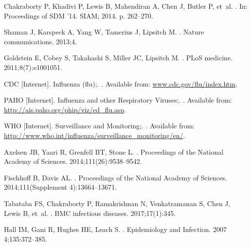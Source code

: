 \documentclass[10pt,letterpaper]{article}
\begin{document}
\begin{thebibliography}{10}

Chakraborty P, Khadivi P, Lewis B, Mahendiran A, Chen J, Butler P, et~al.
.
\newblock In: Proceedings of SDM '14. SIAM; 2014. p. 262--270.

Shaman J, Karspeck A, Yang W, Tamerius J, Lipsitch M.
.
\newblock Nature communications. 2013;4.

Goldstein E, Cobey S, Takahashi S, Miller JC, Lipsitch M.
.
\newblock PLoS medicine. 2011;8(7):e1001051.

{CDC [Internet]}. {Influenza (flu)};.
.
\newblock Available from: \url{www.cdc.gov/flu/index.htm}.

{PAHO [Internet]}. {Influenza and other Respiratory Viruses};.
.
\newblock Available from: \url{http://ais.paho.org/phip/viz/ed_flu.asp}.

{WHO [Internet]}. {Surveillance and Monitoring};.
.
\newblock Available from:
  \url{http://www.who.int/influenza/surveillance_monitoring/en/}.

Axelsen JB, Yaari R, Grenfell BT, Stone L.
.
\newblock Proceedings of the National Academy of Sciences.
  2014;111(26):9538--9542.

Fischhoff B, Davis AL.
.
\newblock Proceedings of the National Academy of Sciences. 2014;111(Supplement
  4):13664--13671.

Tabataba FS, Chakraborty P, Ramakrishnan N, Venkatramanan S, Chen J, Lewis B,
  et~al.
.
\newblock BMC infectious diseases. 2017;17(1):345.

Hall IM, Gani R, Hughes HE, Leach S.
.
\newblock Epidemiology and Infection. 2007 4;135:372--385.


\end{thebibliography}
\end{document}
